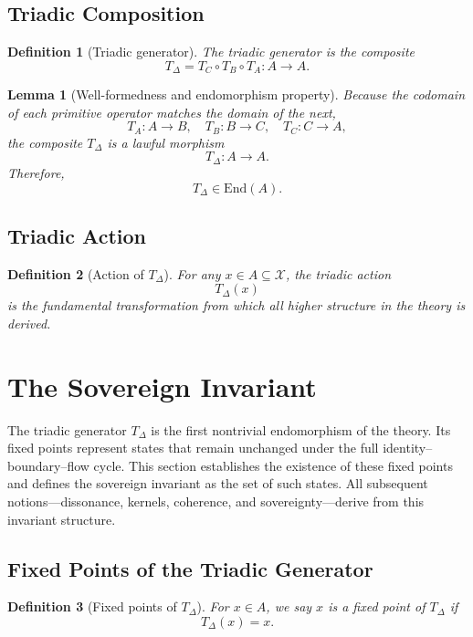 \documentclass[12pt]{article}
\newtheorem{definition}{Definition}
\newtheorem{lemma}{Lemma}
\begin{document}
\subsection{Triadic Composition}

\begin{definition}[Triadic generator]
The triadic generator is the composite
\[
T_\Delta = T_C \circ T_B \circ T_A : A \to A.
\]
\end{definition}

\begin{lemma}[Well-formedness and endomorphism property]
Because the codomain of each primitive operator matches the domain of
the next,
\[
T_A:A\to B,\quad
T_B:B\to C,\quad
T_C:C\to A,
\]
the composite $T_\Delta$ is a lawful morphism
\[
T_\Delta:A\to A.
\]
Therefore,
\[
T_\Delta \in \mathrm{End}(A).
\]
\end{lemma}

\subsection{Triadic Action}

\begin{definition}[Action of $T_\Delta$]
For any $x\in A\subseteq\mathcal{X}$, the triadic action
\[
T_\Delta(x)
\]
is the fundamental transformation from which all higher structure in the
theory is derived.
\end{definition}

\section{The Sovereign Invariant}

The triadic generator $T_\Delta$ is the first nontrivial endomorphism of
the theory. Its fixed points represent states that remain unchanged under
the full identity–boundary–flow cycle. This section establishes the
existence of these fixed points and defines the sovereign invariant as
the set of such states. All subsequent notions—dissonance, kernels,
coherence, and sovereignty—derive from this invariant structure.

\subsection{Fixed Points of the Triadic Generator}

\begin{definition}[Fixed points of $T_\Delta$]
For $x\in A$, we say $x$ is a fixed point of $T_\Delta$ if
\[
T_\Delta(x)=x.
\]
\end{definition}
\end{document}
